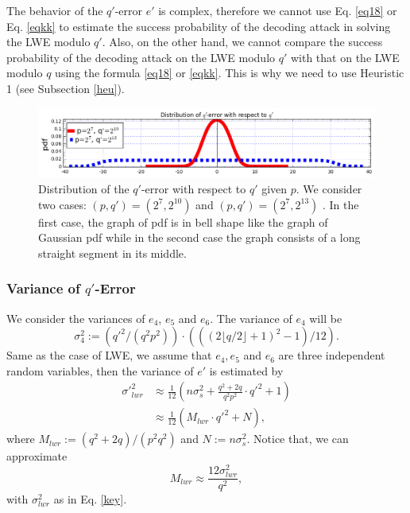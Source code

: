 \documentclass{cta-author}
\begin{document}
The behavior of the $q'$-error $e'$ is complex, therefore we cannot use Eq. \eqref{eq18} or Eq. \eqref{eqkk} to estimate the success probability of the  decoding  attack in solving the LWE modulo $q'$. Also, on the other hand, we cannot compare the success probability of the  decoding  attack on the LWE modulo $q'$ with that on the LWE modulo $q$ using the formula \eqref{eq18} or \eqref{eqkk}. This is why we need to use Heuristic 1 (see Subsection \ref{heu}).

	\begin{figure}
	\includegraphics[scale=0.34]{error_distribution2.png}
	\caption{Distribution of the $q'$-error with respect to $q'$ given $p$. We consider two cases: $(p,q')=(2^7,2^{10})$ and $(p,q')=(2^7,2^{13})$ . In the first case, the graph of pdf is in bell shape like the graph of Gaussian pdf while in the second case the graph consists of a long straight segment in its middle. }
	\label{h2}
\end{figure}



\subsubsection {Variance of $q'$-Error}
We consider the variances of $e_4$, $e_5$ and $e_6$. The variance of $e_4$ will be
$$\sigma_4^2:=\left({q'^2}/{(q^2p^2)}\right)\cdot \left(\left(\left(2\lfloor q/2 \rfloor+1 \right)^2-1\right)/{12}\right).$$
Same as the case of LWE, we assume that $e_4, e_5$ and $e_6$ are three independent random variables, then the variance of $e'$ is estimated by
\begin{equation}\label{eq13}
\begin{split}
{\sigma'}_{lwr}^2& \approx \frac{1}{12} \left(n\sigma^2_s+\frac{q^2+2q}{q^2p^2}\cdot q'^2+1 \right)\\
&\approx \frac{1}{12} \left(M_{lwr} \cdot q'^2+N \right),
\end{split}
\end{equation}
where   $M_{lwr}:=(q^2+2q)/(p^2q^2)$ and $N:=n\sigma_s^2.$
Notice that, we can approximate 
\begin{equation}\label{eqmoi}
M_{lwr} \approx \frac{12\sigma_{lwr}^2}{q^2},
\end{equation}
with $\sigma_{lwr}^2$ as in Eq. \eqref{key}.
\end{document}

